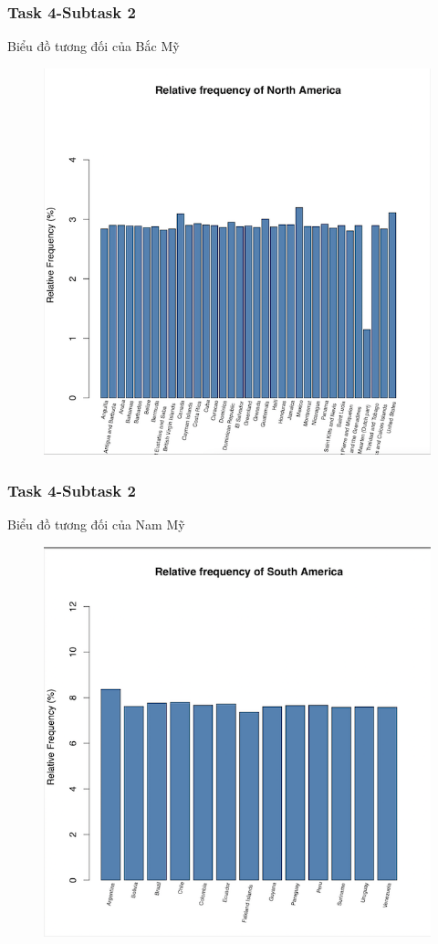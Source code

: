 \documentclass[english,10pt,table]{beamer}
\begin{document}
\frame
{
    \frametitle{Task 4-Subtask 2}
    \begin{block}{Biểu đồ tương đối của Bắc Mỹ}
    \begin{figure}
        \centering
        \includegraphics[scale=0.5]{images/4.2.4.png}
    \end{figure}
    \end{block}
}
\frame
{
    \frametitle{Task 4-Subtask 2}
    \begin{block}{Biểu đồ tương đối của Nam Mỹ}
    \begin{figure}
        \centering
        \includegraphics[scale=0.5]{images/4.2.5.png}
    \end{figure}
    \end{block}
}
\end{document}
